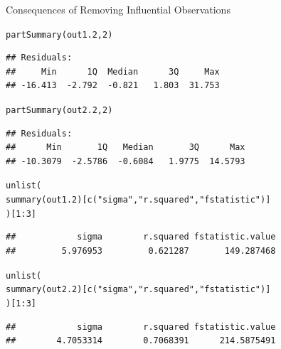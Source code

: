 \documentclass{beamer}\usepackage[]{graphicx}\usepackage[]{color}
\makeatletter
\newcommand{\hlnum}[1]{\textcolor[rgb]{0.69,0.494,0}{#1}}%
\newcommand{\hlstr}[1]{\textcolor[rgb]{0.749,0.012,0.012}{#1}}%
\newcommand{\hlopt}[1]{\textcolor[rgb]{0,0,0}{#1}}%
\newcommand{\hlstd}[1]{\textcolor[rgb]{0,0,0}{#1}}%
\newcommand{\hlkwd}[1]{\textcolor[rgb]{0.004,0.004,0.506}{#1}}%
\newenvironment{kframe}{%
 \def\at@end@of@kframe{}%
 \ifinner\ifhmode%
  \def\at@end@of@kframe{\end{minipage}}%
  \begin{minipage}{\columnwidth}%
 \fi\fi%
 \def\FrameCommand##1{\hskip\@totalleftmargin \hskip-\fboxsep
 \colorbox{shadecolor}{##1}\hskip-\fboxsep
     \hskip-\linewidth \hskip-\@totalleftmargin \hskip\columnwidth}%
 \MakeFramed {\advance\hsize-\width
   \@totalleftmargin\z@ \linewidth\hsize
   \@setminipage}}%
 {\par\unskip\endMakeFramed%
 \at@end@of@kframe}
\newenvironment{knitrout}{}{} %
\makeatother
\begin{document}
\begin{frame}{Consequences of Removing Influential 
    Observations}
\pagebreak

\begin{knitrout}\footnotesize
{}\color{fgcolor}\begin{kframe}
\begin{alltt}
\hlkwd{partSummary}\hlstd{(out1.2,} \hlnum{2}\hlstd{)}
\end{alltt}
\begin{verbatim}
## Residuals:
##     Min      1Q  Median      3Q     Max 
## -16.413  -2.792  -0.821   1.803  31.753
\end{verbatim}
\begin{alltt}
\hlkwd{partSummary}\hlstd{(out2.2,} \hlnum{2}\hlstd{)}
\end{alltt}
\begin{verbatim}
## Residuals:
##      Min       1Q   Median       3Q      Max 
## -10.3079  -2.5786  -0.6084   1.9775  14.5793
\end{verbatim}
\end{kframe}
\end{knitrout}

\pagebreak

\begin{knitrout}\footnotesize
{}\color{fgcolor}\begin{kframe}
\begin{alltt}
\hlkwd{unlist}\hlstd{(}
    \hlkwd{summary}\hlstd{(out1.2)[}\hlkwd{c}\hlstd{(}\hlstr{"sigma"}\hlstd{,} \hlstr{"r.squared"}\hlstd{,} \hlstr{"fstatistic"}\hlstd{)]}
\hlstd{)[}\hlnum{1} \hlopt{:} \hlnum{3}\hlstd{]}
\end{alltt}
\begin{verbatim}
##            sigma        r.squared fstatistic.value 
##         5.976953         0.621287       149.287468
\end{verbatim}
\begin{alltt}
\hlkwd{unlist}\hlstd{(}
    \hlkwd{summary}\hlstd{(out2.2)[}\hlkwd{c}\hlstd{(}\hlstr{"sigma"}\hlstd{,} \hlstr{"r.squared"}\hlstd{,} \hlstr{"fstatistic"}\hlstd{)]}
\hlstd{)[}\hlnum{1} \hlopt{:} \hlnum{3}\hlstd{]}
\end{alltt}
\begin{verbatim}
##            sigma        r.squared fstatistic.value 
##        4.7053314        0.7068391      214.5875491
\end{verbatim}
\end{kframe}
\end{knitrout}

\end{frame}
\end{document}
